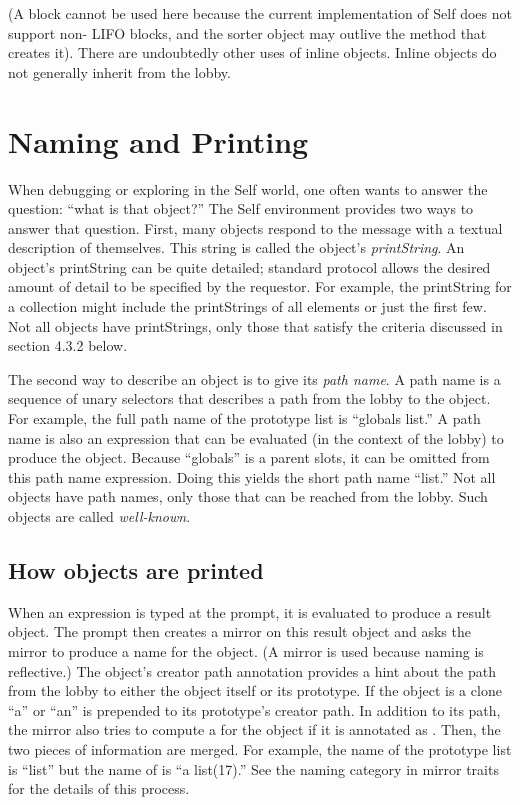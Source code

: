 \documentclass[letterpaper,10pt,english]{sphinxmanual}
\begin{document}
(A block cannot be used here because the current implementation of Self does not support non-
LIFO blocks, and the sorter object may outlive the method that creates it). There are undoubtedly
other uses of inline objects. Inline objects do not generally inherit from the lobby.


\section{Naming and Printing}
\label{progguid:naming-and-printing}
When debugging or exploring in the Self world, one often wants to answer the question: “what is
that object?” The Self environment provides two ways to answer that question. First, many objects
respond to the  message with a textual description of themselves. This string
is called the object’s \emph{printString}. An object’s printString can be quite detailed; standard protocol
allows the desired amount of detail to be specified by the requestor. For example, the printString
for a collection might include the printStrings of all elements or just the first few. Not all objects
have printStrings, only those that satisfy the criteria discussed in section 4.3.2 below.

The second way to describe an object is to give its \emph{path name}. A path name is a sequence of unary
selectors that describes a path from the lobby to the object. For example, the full path name of the
prototype list is “globals list.” A path name is also an expression that can be evaluated (in the context
of the lobby) to produce the object. Because “globals” is a parent slots, it can be omitted from
this path name expression. Doing this yields the short path name “list.” Not all objects have path
names, only those that can be reached from the lobby. Such objects are called \emph{well-known}.


\subsection{How objects are printed}
\label{progguid:how-objects-are-printed}
When an expression is typed at the prompt, it is evaluated to produce a result object. The prompt
then creates a mirror on this result object and asks the mirror to produce a name for the object. (A
mirror is used because naming is reflective.) The object’s creator path annotation provides a hint
about the path from the lobby to either the object itself or its prototype. If the object is a clone “a”
or “an” is prepended to its prototype’s creator path. In addition to its path, the mirror also tries to
compute a  for the object if it is annotated as . Then, the two pieces of
information are merged. For example, the name of the prototype list is “list” but the name of 
is “a list(17).” See the naming category in mirror traits for the details of this process.
\end{document}
